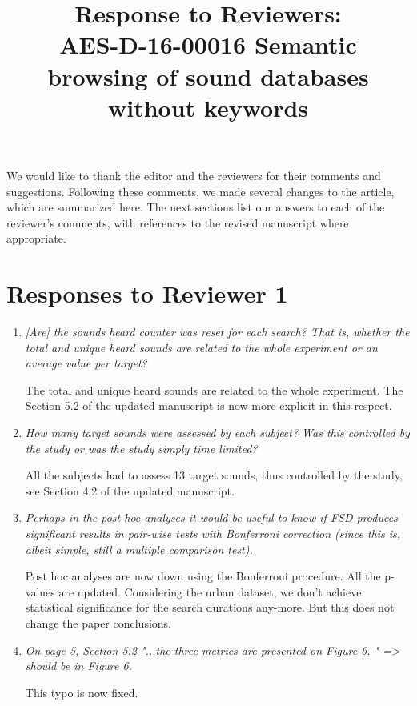 \documentclass[10pt]{article}
\title{Response to Reviewers: \\ AES-D-16-00016
Semantic browsing of sound databases without keywords}
\newcommand{\ml}[1]{\textcolor{blue}{ Mathieu : #1}}
\begin{document}
\maketitle

We would like to thank the editor and the reviewers for their comments and suggestions. Following these comments, we made several changes to the article, which are summarized here. The next sections list our answers to each of the reviewer’s comments, with references to the revised manuscript where appropriate.


\section{Responses to Reviewer 1}

\begin{enumerate}

\item \emph{[Are] the sounds heard counter was reset for each search? That is, whether the total and unique heard sounds are related to the whole experiment or an average value per target?}

The total and unique heard sounds are related to the whole experiment. The Section 5.2 of the updated manuscript is now more explicit in this respect.

\item \emph{How many target sounds were assessed by each subject? Was this controlled by the study or was the study simply time limited?}

All the subjects had to assess 13 target sounds, thus controlled by the study, see Section 4.2 of the updated manuscript.

\item \emph{Perhaps in the post-hoc analyses it would be useful to know if FSD produces significant results in pair-wise tests with Bonferroni correction (since this is, albeit simple, still a multiple comparison test).}

Post hoc analyses are now down using the Bonferroni procedure. All the p-values are updated. Considering the urban dataset, we don't achieve statistical significance for the search durations any-more. But this does not change the paper conclusions.

\item \emph{On page 5, Section 5.2  "...the three metrics are presented on Figure 6. " => should be in Figure 6.}

This typo is now fixed.

\end{enumerate}
\end{document}
